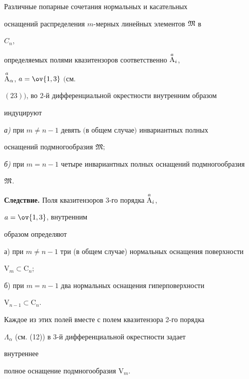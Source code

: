 \begin{thm} 


Различные попарные сочетания нормальных и касательных 


оснащений распределения $m$-мерных линейных элементов $\frak M$ в 


$C_n$, 


определяемых полями квазитензоров соответственно $\overset{a}{\mathrm A}{}_i$, 


$\overset{a}{\mathrm A}{}_\alpha$, $a=\ov{1,3}$ $($см. 


$(23))$, во $2$-й дифференциальной окрестности внутренним образом 


индуцируют 


 


{\em а)} при $m\ne n-1$ девять $($в общем случае$)$ инвариантных полных 


оснащений подмногообразия $\frak M;$ 


 


{\em б)} при $m=n-1$ четыре инвариантных полных оснащений подмногообразия 


$\frak M$. 


\end{thm} 


 


{\bf Следствие.} Поля квазитензоров 3-го порядка $\overset{a}{\mathrm A}{}_i$, 


$a=\ov{1,3}$, внутренним 


образом определяют 


 


а) при $m\ne n-1$ три (в общем случае) нормальных оснащения поверхности 


$\mathrm V_m\subset\mathrm C_n$; 


 


б) при $m=n-1$ два нормальных оснащения гиперповерхности 


$\mathrm V_{n-1}\subset\mathrm C_n$.


 


Каждое из этих полей вместе с полем квазитензора 2-го порядка 


$\Lambda_\alpha$ (см. (12)) в 3-й дифференциальной окрестности задает 


внутреннее 


полное оснащение подмногообразия $\mathrm V_m$. 


